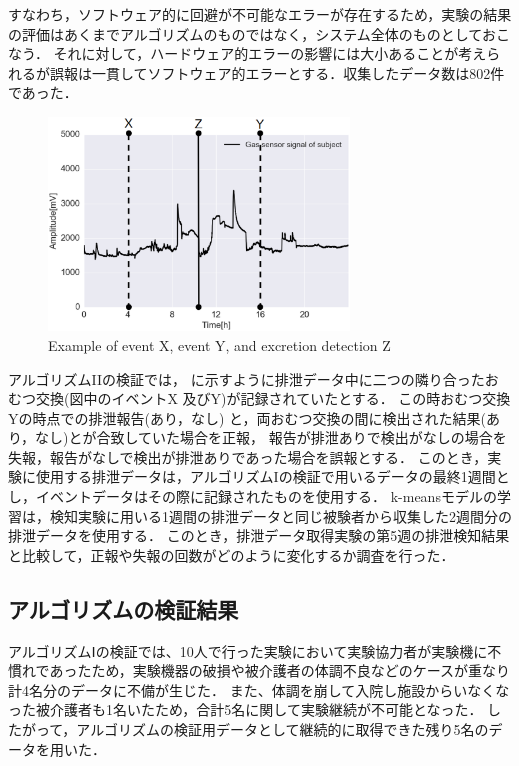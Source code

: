 すなわち，ソフトウェア的に回避が不可能なエラーが存在するため，実験の結果の評価はあくまでアルゴリズムのものではなく，システム全体のものとしておこなう．
それに対して，ハードウェア的エラーの影響には大小あることが考えられるが誤報は一貫してソフトウェア的エラーとする．収集したデータ数は802件であった．

\begin{figure}[t]
  \centering
  \includegraphics[width=8cm]{./fig/xyz.eps}
  \caption{Example of event X, event Y, and excretion detection Z}
  \label{event}
\end{figure}

アルゴリズムI\hspace{-.1em}Iの検証では，
に示すように排泄データ中に二つの隣り合ったおむつ交換(図中のイベントX 及びY)が記録されていたとする．
この時おむつ交換Yの時点での排泄報告(あり，なし) と，両おむつ交換の間に検出された結果(あり，なし)とが合致していた場合を正報，
報告が排泄ありで検出がなしの場合を失報，報告がなしで検出が排泄ありであった場合を誤報とする．
このとき，実験に使用する排泄データは，アルゴリズムIの検証で用いるデータの最終1週間とし，イベントデータはその際に記録されたものを使用する．
k-meansモデルの学習は，検知実験に用いる1週間の排泄データと同じ被験者から収集した2週間分の排泄データを使用する．
このとき，排泄データ取得実験の第5週の排泄検知結果と比較して，正報や失報の回数がどのように変化するか調査を行った．


\subsection{アルゴリズムの検証結果}\label{chap:3.3.4}
アルゴリズムⅠの検証では、10人で行った実験において実験協力者が実験機に不慣れであったため，実験機器の破損や被介護者の体調不良などのケースが重なり計4名分のデータに不備が生じた．
また、体調を崩して入院し施設からいなくなった被介護者も1名いたため，合計5名に関して実験継続が不可能となった．
したがって，アルゴリズムの検証用データとして継続的に取得できた残り5名のデータを用いた．


